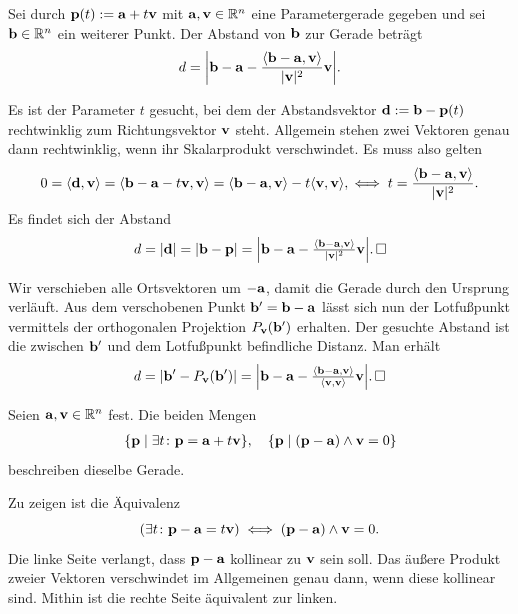\begin{Satz}
Sei durch $\mathbf{p}(t):=\mathbf{a}+ t\mathbf{v}$ mit $\mathbf{a}, \mathbf{v}\in\mathbb R^n$ eine
Parametergerade gegeben und sei $\mathbf{b}\in\mathbb R^n$ ein weiterer Punkt.
Der Abstand von $\mathbf{b}$ zur Gerade beträgt
\[d = \bigg|\mathbf{b}-\mathbf{a} - \frac{\langle\mathbf{b}-\mathbf{a},\mathbf{v}\rangle}{|\mathbf{v}|^2}\mathbf{v}\bigg|.\]
\end{Satz}
\begin{Beweis}[Beweis 1]
Es ist der Parameter $t$ gesucht, bei dem der Abstandsvektor
$\mathbf{d} := \mathbf{b}-\mathbf{p}(t)$ rechtwinklig zum Richtungsvektor $\mathbf{v}$ steht.
Allgemein stehen zwei Vektoren genau dann rechtwinklig, wenn ihr
Skalarprodukt verschwindet. Es muss also gelten
\[0 = \langle\mathbf{d},\mathbf{v}\rangle
= \langle\mathbf{b} - \mathbf{a}-t\mathbf{v}, \mathbf{v}\rangle
= \langle\mathbf{b} - \mathbf{a}, \mathbf{v}\rangle - t\langle\mathbf{v},\mathbf{v}\rangle,
\iff t = \frac{\langle\mathbf{b}-\mathbf{a},\mathbf{v}\rangle}{|\mathbf{v}|^2}.\]
Es findet sich der Abstand
\[d = |\mathbf{d}| = |\mathbf{b}-\mathbf{p}|
= \Big|\mathbf{b} - \mathbf{a} - \tfrac{\langle\mathbf{b}-\mathbf{a},\mathbf{v}\rangle}
{|\mathbf{v}|^2}\mathbf{v}\Big|.\,\square\]
\end{Beweis}
\begin{Beweis}[Beweis 2]
Wir verschieben alle Ortsvektoren um $-\mathbf{a}$, damit die Gerade
durch den Ursprung verläuft. Aus dem verschobenen Punkt
$\mathbf{b}' = \mathbf{b}-\mathbf{a}$ lässt sich nun der Lotfußpunkt vermittels der
orthogonalen Projektion $P_{\mathbf{v}}(\mathbf{b}')$ erhalten. Der gesuchte
Abstand ist die zwischen $\mathbf{b}'$ und dem Lotfußpunkt befindliche
Distanz. Man erhält
\[d = |\mathbf{b}' - P_{\mathbf{v}}(\mathbf{b}')|
= \Big|\mathbf{b}-\mathbf{a} - \tfrac{\langle\mathbf{b}-\mathbf{a},\mathbf{v}\rangle}
{\langle\mathbf{v},\mathbf{v}\rangle}\mathbf{v}\Big|.\,\square\]
\end{Beweis}

\begin{Korollar}
Seien $\mathbf{a},\mathbf{v}\in\mathbb R^n$ fest. Die beiden Mengen
\begin{gather*}
\{\mathbf{p}\mid \exists t\colon\mathbf{p} = \mathbf{a}+t\mathbf{v}\},\quad
\{\mathbf{p}\mid (\mathbf{p}-\mathbf{a})\wedge\mathbf{v} = 0\}
\end{gather*}
beschreiben dieselbe Gerade.
\end{Korollar}
\begin{Beweis}
Zu zeigen ist die Äquivalenz
\[(\exists t\colon\mathbf{p}-\mathbf{a} = t\mathbf{v})\iff (\mathbf{p}-\mathbf{a})\wedge\mathbf{v} = 0.\]
Die linke Seite verlangt, dass $\mathbf{p}-\mathbf{a}$ kollinear zu $\mathbf{v}$ sein
soll. Das äußere Produkt zweier Vektoren verschwindet im Allgemeinen
genau dann, wenn diese kollinear sind. Mithin ist die rechte Seite
äquivalent zur linken.\,\qedsymbol
\end{Beweis}

